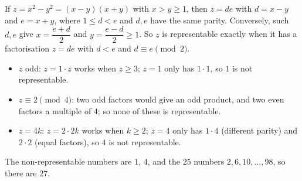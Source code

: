 If $z=x^2-y^2=(x-y)(x+y)$ with $x>y\ge1$, then $z=de$ with $d=x-y$ and $e=x+y$, where $1\le d<e$ and $d,e$ have the same parity. Conversely, such $d,e$ give $x=\dfrac{e+d}{2}$ and $y=\dfrac{e-d}{2}\ge1$. So $z$ is representable exactly when it has a factorisation $z=de$ with $d<e$ and $d\equiv e\pmod2$.
\begin{itemize}
\item $z$ odd: $z=1\cdot z$ works when $z\ge3$; $z=1$ only has $1\cdot1$, so $1$ is not representable.
\item $z\equiv2\pmod4$: two odd factors would give an odd product, and two even factors a multiple of $4$; so none of these is representable.
\item $z=4k$: $z=2\cdot2k$ works when $k\ge2$; $z=4$ only has $1\cdot4$ (different parity) and $2\cdot2$ (equal factors), so $4$ is not representable.
\end{itemize}
The non-representable numbers are $1$, $4$, and the $25$ numbers $2,6,10,\dots,98$, so there are $\boxed{27}$.

